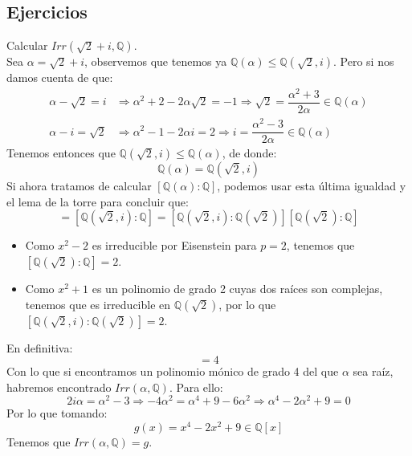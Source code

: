 \subsection{Ejercicios}
\begin{ejercicio}
    Calcular $Irr(\sqrt{2}+i,\mathbb{Q})$.\\ 

    \noindent
    Sea $\alpha = \sqrt{2}+i$, observemos que tenemos ya $\mathbb{Q}(\alpha)\leq \mathbb{Q}(\sqrt{2},i)$. Pero si nos damos cuenta de que:
    \begin{align*}
        \alpha-\sqrt{2} = i &\Longrightarrow \alpha^2+2-2\alpha\sqrt{2} = -1 \Longrightarrow \sqrt{2} = \dfrac{\alpha^2+3}{2\alpha} \in \mathbb{Q}(\alpha) \\
        \alpha-i = \sqrt{2} &\Longrightarrow \alpha^2-1-2\alpha i = 2 \Longrightarrow i = \dfrac{\alpha^2-3}{2\alpha}\in \mathbb{Q}(\alpha)
    \end{align*}
    Tenemos entonces que $\mathbb{Q}(\sqrt{2},i)\leq \mathbb{Q}(\alpha)$, de donde:
    \begin{equation*}
        \mathbb{Q}(\alpha) = \mathbb{Q}(\sqrt{2},i)
    \end{equation*}
    Si ahora tratamos de calcular $[\mathbb{Q}(\alpha):\mathbb{Q}]$, podemos usar esta última igualdad y el lema de la torre para concluir que:
    \begin{equation*}
        [\mathbb{Q}(\alpha):\mathbb{Q}] = [\mathbb{Q}(\sqrt{2},i):\mathbb{Q}] = [\mathbb{Q}(\sqrt{2},i):\mathbb{Q}(\sqrt{2})][\mathbb{Q}(\sqrt{2}):\mathbb{Q}]
    \end{equation*}
    \begin{itemize}
        \item Como $x^2-2$ es irreducible por Eisenstein para $p=2$, tenemos que \newline $[\mathbb{Q}(\sqrt{2}):\mathbb{Q}]=2$.
        \item Como $x^2+1$ es un polinomio de grado 2 cuyas dos raíces son complejas, tenemos que es irreducible en $\mathbb{Q}(\sqrt{2})$, por lo que $[\mathbb{Q}(\sqrt{2},i):\mathbb{Q}(\sqrt{2})]=2$.
    \end{itemize}
    En definitiva:
    \begin{equation*}
        [\mathbb{Q}(\alpha):\mathbb{Q}] = 4
    \end{equation*}
    Con lo que si encontramos un polinomio mónico de grado 4 del que $\alpha$ sea raíz, habremos encontrado $Irr(\alpha,\mathbb{Q})$. Para ello:
    \begin{equation*}
        2i\alpha = \alpha^2 -3 \Longrightarrow -4\alpha^2 = \alpha^4 + 9 - 6\alpha^2 \Longrightarrow \alpha^4 -2\alpha^2+9 = 0
    \end{equation*}
    Por lo que tomando:
    \begin{equation*}
        g(x) = x^4-2x^2+9 \in \mathbb{Q}[x]
    \end{equation*}
    Tenemos que $Irr(\alpha,\mathbb{Q}) = g$.
\end{ejercicio}


